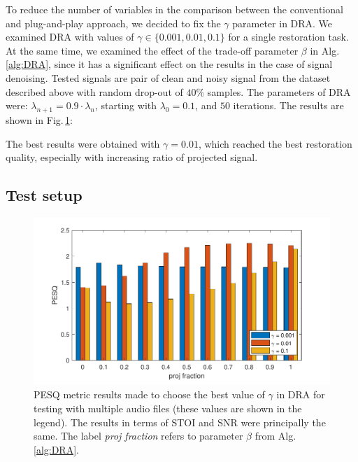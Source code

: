 \documentclass[conference]{IEEEtran}
\newcommand{\todo}[1]{\textcolor{red}{#1}}
\begin{document}
To reduce the number of variables in the comparison between the conventional and plug-and-play approach, we decided to fix the $\gamma$ parameter in DRA.
We examined DRA with values of $\gamma\in\{0.001, 0.01,0.1\}$ for a single restoration task.
At the same time, we examined the effect of the trade-off parameter $\beta$ in Alg.\,\ref{alg:DRA}, since it has a significant effect on the results in the case of signal denoising. 
Tested signals are pair of clean and noisy signal from the dataset described above with random drop-out of $40\%$ samples.
The parameters of DRA were: $\lambda_{n+1}=0.9\cdot\lambda_{n}$, starting with $\lambda_0=0.1$, and $50$ iterations. 
The results are shown in Fig.\,\ref{fig:gammatest}:

The best results were obtained with $\gamma=0.01$, which reached the best restoration quality, especially with increasing ratio of projected signal.

\subsection{Test setup}


\begin{figure}[h]
	\includegraphics[width=1\linewidth]{figures/gamma_test}
	\caption{PESQ metric results made to choose the best value of $\gamma$ in DRA for testing with multiple audio files (these values are shown in the legend). %
		The results in terms of STOI and SNR were principally the same.
		The label \textit{proj fraction} refers to parameter $\beta$ from Alg.\,\ref{alg:DRA}.}
	\label{fig:gammatest}
	\vspace{-1em}
\end{figure}
\end{document}
